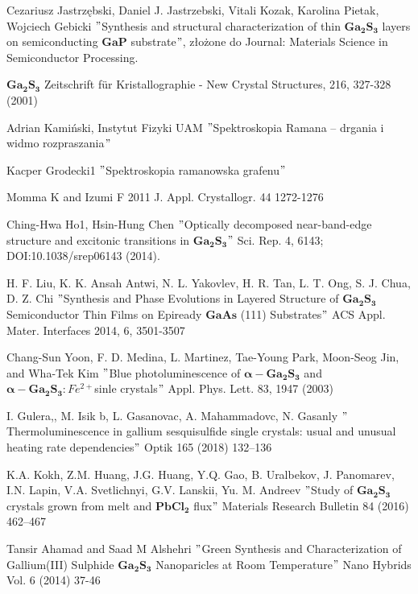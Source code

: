 \newpage
 
\begin{thebibliography}{}
	 Cezariusz Jastrzębski, Daniel J. Jastrzebski, Vitali Kozak, Karolina Pietak, Wojciech Gebicki $"$Synthesis and structural characterization of thin $\mathbf{Ga_{2}S_{3}}$ layers on semiconducting $\mathbf{GaP}$ substrate$"$, złożone do Journal: Materials Science in Semiconductor Processing.
	
	 $\mathbf{Ga_{2}S_{3}}$ Zeitschrift für Kristallographie - New Crystal Structures, 216, 327-328 (2001)
	
	 Adrian Kamiński, Instytut Fizyki UAM $"$Spektroskopia Ramana – drgania i widmo rozpraszania$"$
	
	 Kacper Grodecki1 $"$Spektroskopia ramanowska grafenu$"$
	
	 Momma K and Izumi F 2011 J. Appl. Crystallogr. 44 1272-1276
	
	 Ching-Hwa Ho1, Hsin-Hung Chen $"$Optically decomposed near-band-edge structure and excitonic transitions in
	$\mathbf{Ga_{2}S_{3}}$$"$ Sci. Rep. 4, 6143; DOI:10.1038/srep06143
	(2014).
	
	 H. F. Liu, K. K. Ansah Antwi, N. L. Yakovlev, H. R. Tan, L. T. Ong, S. J. Chua, D. Z. Chi $"$Synthesis and Phase Evolutions in Layered Structure of $\mathbf{Ga_{2}S_{3}}$ Semiconductor Thin Films on Epiready $\mathbf{GaAs}$ (111) Substrates$"$ ACS Appl. Mater. Interfaces 2014, 6, 3501-3507
	
	 Chang-Sun Yoon, F. D. Medina, L. Martinez, Tae-Young Park, Moon-Seog Jin, and Wha-Tek Kim $"$Blue photoluminescence of $\mathbf{\alpha-Ga_{2}S_{3}}$ and $\mathbf{\alpha-Ga_{2}S_{3}}:Fe^{2+} $sinle crystals$"$ Appl. Phys. Lett. 83, 1947 (2003)
	
	 I. Gulera,, M. Isik b, L. Gasanovac, A. Mahammadovc, N. Gasanly $"$Thermoluminescence in gallium sesquisulfide single crystals:
	usual and unusual heating rate dependencies$"$ Optik 165 (2018) 132–136
	
	 K.A. Kokh, Z.M. Huang, J.G. Huang, Y.Q. Gao, B. Uralbekov, J. Panomarev, I.N. Lapin, V.A. Svetlichnyi, G.V. Lanskii, Yu. M. Andreev $"$Study of $\mathbf{Ga_{2}S_{3}}$ crystals grown from melt and $\mathbf{PbCl_{2}}$ flux$"$ Materials Research Bulletin 84 (2016) 462–467
	
	 Tansir Ahamad and Saad M Alshehri $"$Green Synthesis and Characterization of Gallium(III) Sulphide $\mathbf{Ga_{2}S_{3}}$
	Nanoparicles at Room Temperature$"$ Nano Hybrids Vol. 6 (2014) 37-46
	

\end{thebibliography}
